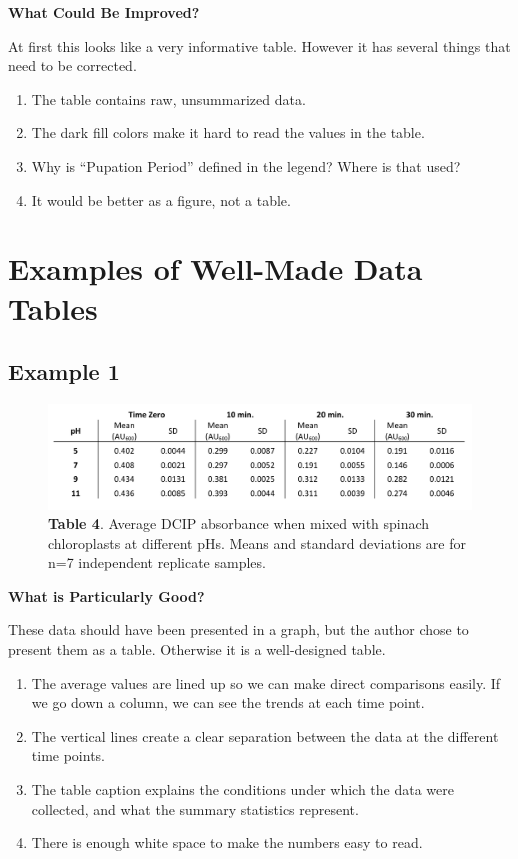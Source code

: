 \documentclass[
]{book}
\providecommand{\tightlist}{%
  \setlength{\itemsep}{0pt}\setlength{\parskip}{0pt}}
\begin{document}
\textbf{What Could Be Improved?}

At first this looks like a very informative table. However it has several things that need to be corrected.

\begin{enumerate}
\def\labelenumi{\arabic{enumi}.}
\tightlist
\item
  The table contains raw, unsummarized data.
\item
  The dark fill colors make it hard to read the values in the table.
\item
  Why is ``Pupation Period'' defined in the legend? Where is that used?
\item
  It would be better as a figure, not a table.
\end{enumerate}

\hypertarget{examples-of-well-made-data-tables}{%
\section{Examples of Well-Made Data Tables}\label{examples-of-well-made-data-tables}}

\hypertarget{example-1-15}{%
\subsection{Example 1}\label{example-1-15}}

\begin{figure}
\centering
\includegraphics{images/Good_table1.png}
\caption{\textbf{Table 4}. Average DCIP absorbance when mixed with spinach chloroplasts at different pHs. Means and standard deviations are for n=7 independent replicate samples.}
\end{figure}

\textbf{What is Particularly Good?}

These data should have been presented in a graph, but the author chose to present them as a table. Otherwise it is a well-designed table.

\begin{enumerate}
\def\labelenumi{\arabic{enumi}.}
\tightlist
\item
  The average values are lined up so we can make direct comparisons easily. If we go down a column, we can see the trends at each time point.
\item
  The vertical lines create a clear separation between the data at the different time points.
\item
  The table caption explains the conditions under which the data were collected, and what the summary statistics represent.
\item
  There is enough white space to make the numbers easy to read.
\end{enumerate}
\end{document}

